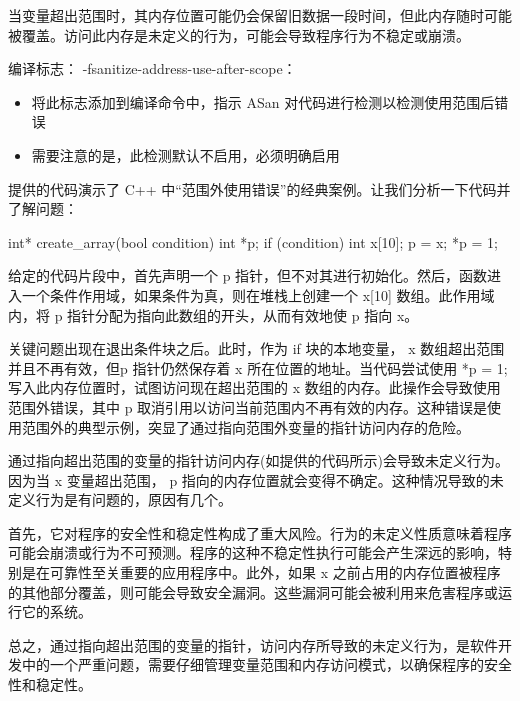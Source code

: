 当变量超出范围时，其内存位置可能仍会保留旧数据一段时间，但此内存随时可能被覆盖。访问此内存是未定义的行为，可能会导致程序行为不稳定或崩溃。


编译标志： -fsanitize-address-use-after-scope：

\begin{itemize}
\item
将此标志添加到编译命令中，指示 ASan 对代码进行检测以检测使用范围后错误

\item
需要注意的是，此检测默认不启用，必须明确启用
\end{itemize}


提供的代码演示了 C++ 中“范围外使用错误”的经典案例。让我们分析一下代码并了解问题：

\begin{cpp}
int* create_array(bool condition) {
    int *p;
    if (condition) {
        int x[10];
        p = x;
    }
    *p = 1;
}
\end{cpp}

给定的代码片段中，首先声明一个 p 指针，但不对其进行初始化。然后，函数进入一个条件作用域，如果条件为真，则在堆栈上创建一个 x[10] 数组。此作用域内，将 p 指针分配为指向此数组的开头，从而有效地使 p 指向 x。

关键问题出现在退出条件块之后。此时，作为 if 块的本地变量， x 数组超出范围并且不再有效，但p 指针仍然保存着 x 所在位置的地址。当代码尝试使用 *p = 1; 写入此内存位置时，试图访问现在超出范围的 x 数组的内存。此操作会导致使用范围外错误，其中 p 取消引用以访问当前范围内不再有效的内存。这种错误是使用范围外的典型示例，突显了通过指向范围外变量的指针访问内存的危险。

通过指向超出范围的变量的指针访问内存(如提供的代码所示)会导致未定义行为。因为当 x 变量超出范围， p 指向的内存位置就会变得不确定。这种情况导致的未定义行为是有问题的，原因有几个。

首先，它对程序的安全性和稳定性构成了重大风险。行为的未定义性质意味着程序可能会崩溃或行为不可预测。程序的这种不稳定性执行可能会产生深远的影响，特别是在可靠性至关重要的应用程序中。此外，如果 x 之前占用的内存位置被程序的其他部分覆盖，则可能会导致安全漏洞。这些漏洞可能会被利用来危害程序或运行它的系统。

总之，通过指向超出范围的变量的指针，访问内存所导致的未定义行为，是软件开发中的一个严重问题，需要仔细管理变量范围和内存访问模式，以确保程序的安全性和稳定性。

